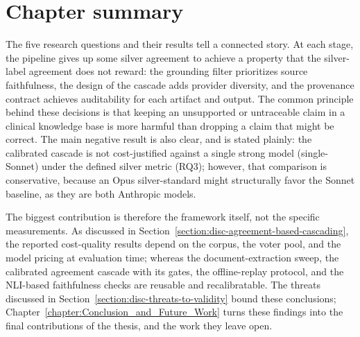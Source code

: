 \section{Chapter summary}\label{section:disc-chapter-summary}

The five research questions and their results tell a connected story. At each stage, the pipeline gives up some silver agreement to achieve a property that the silver-label agreement does not reward: the grounding filter prioritizes source faithfulness, the design of the cascade adds provider diversity, and the provenance contract achieves auditability for each artifact and output. The common principle behind these decisions is that keeping an unsupported or untraceable claim in a clinical knowledge base is more harmful than dropping a claim that might be correct. The main negative result is also clear, and is stated plainly: the calibrated cascade is not cost-justified against a single strong model (single-Sonnet) under the defined silver metric (RQ3); however, that comparison is conservative, because an Opus silver-standard might structurally favor the Sonnet baseline, as they are both Anthropic models. 

The biggest contribution is therefore the framework itself, not the specific measurements. As discussed in Section~\ref{section:disc-agreement-based-cascading}, the reported cost-quality results depend on the corpus, the voter pool, and the model pricing at evaluation time; whereas the document-extraction sweep, the calibrated agreement cascade with its gates, the offline-replay protocol, and the NLI-based faithfulness checks are reusable and recalibratable. The threats discussed in Section~\ref{section:disc-threats-to-validity} bound these conclusions; Chapter~\ref{chapter:Conclusion_and_Future_Work} turns these findings into the final contributions of the thesis, and the work they leave open.